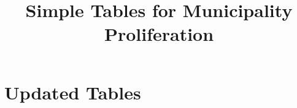 \documentclass{article}
\title{Simple Tables for Municipality Proliferation}
\begin{document}
\maketitle
\tableofcontents
{\footnotesize 
\listoffigures
\listoftables}
\clearpage



\section{Updated Tables}



\clearpage

\begin{table}
\footnotesize
\centering
\caption{The Effect of the Great Migration on Jurisdictions Per Capita using the Shift-Share Design}
\begin{threeparttable}
\footnotesize

\end{threeparttable}
\label{tab:main_effect}
\end{table}
\clearpage

\begin{landscape}

\end{landscape}
\clearpage

\begin{table}[htbp]
\centering {} 
\centering
\caption{Downstream: School Segregation and Achievement}\label{tab:seg}
\begin{threeparttable}
\footnotesize 

    \end{threeparttable}
    \end{table}
\clearpage

\begin{landscape}
\begin{table}[htbp]\centering 
\begin{threeparttable} \caption{Summary statistics}

 \end{threeparttable}
\end{table}
\end{landscape}
\clearpage

\begin{table}[htbp]\centering 
\begin{threeparttable} \caption{New Municipalities Pre-trends}

\end{threeparttable}
\end{table}
\clearpage
\end{document}
